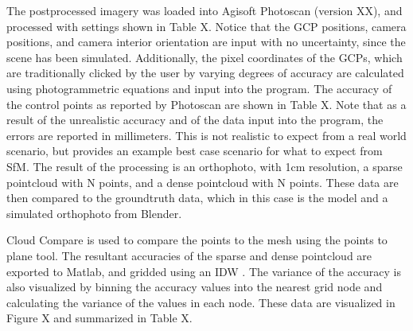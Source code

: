 The postprocessed imagery was loaded into Agisoft Photoscan (version XX), and processed with settings shown in Table X.  Notice that the GCP positions, camera positions, and camera interior orientation are input with no uncertainty, since the scene has been simulated.  Additionally, the pixel coordinates of the GCPs, which are traditionally clicked by the user by varying degrees of accuracy are calculated using photogrammetric equations and input into the program.  The accuracy of the control points as reported by Photoscan are shown in Table X.  Note that as a result of the unrealistic accuracy and of the data input into the program, the errors are reported in millimeters.  This is not realistic to expect from a real world scenario, but provides an example best case scenario for what to expect from SfM. The result of the processing is an orthophoto, with 1cm resolution, a sparse pointcloud with N points, and a dense pointcloud with N points.  These data are then compared to the groundtruth data, which in this case is the model and a simulated orthophoto from Blender.  

Cloud Compare is used to compare the points to the mesh using the points to plane tool.  The resultant accuracies of the sparse and dense pointcloud are exported to Matlab, and gridded using an IDW .  The variance of the accuracy is also visualized by binning the accuracy values into the nearest grid node and calculating the variance of the values in each node.  These data are visualized in Figure X and summarized in Table X.  

